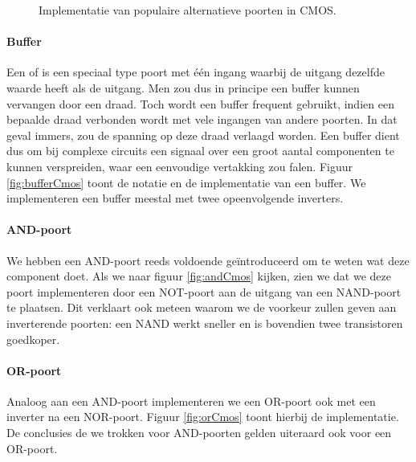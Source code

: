 \begin{figure}[hbt]
{
\label{fig:xnorCmos}
}
\caption{Implementatie van populaire alternatieve poorten in CMOS.}
\label{fig:alternativeGatesCmos}
\end{figure}
\paragraph{Buffer}
Een  of  is een speciaal type poort met \'e\'en ingang waarbij de uitgang dezelfde waarde heeft als de uitgang. Men zou dus in principe een buffer kunnen vervangen door een draad. Toch wordt een buffer frequent gebruikt, indien een bepaalde draad verbonden wordt met vele ingangen van andere poorten. In dat geval immers, zou de spanning op deze draad verlaagd worden. Een buffer dient dus om bij complexe circuits een signaal over een groot aantal componenten te kunnen verspreiden, waar een eenvoudige vertakking zou falen. Figuur \ref{fig:bufferCmos} toont de notatie en de implementatie van een buffer. We implementeren een buffer meestal met twee opeenvolgende inverters.
\paragraph{AND-poort}
We hebben een AND-poort reeds voldoende ge\"introduceerd om te weten wat deze component doet. Als we naar figuur \ref{fig:andCmos} kijken, zien we dat we deze poort implementeren door een NOT-poort aan de uitgang van een NAND-poort te plaatsen. Dit verklaart ook meteen waarom we de voorkeur zullen geven aan inverterende poorten: een NAND werkt sneller en is bovendien twee transistoren goedkoper.
\paragraph{OR-poort}
Analoog aan een AND-poort implementeren we een OR-poort ook met een inverter na een NOR-poort. Figuur \ref{fig:orCmos} toont hierbij de implementatie. De conclusies de we trokken voor AND-poorten gelden uiteraard ook voor een OR-poort.
